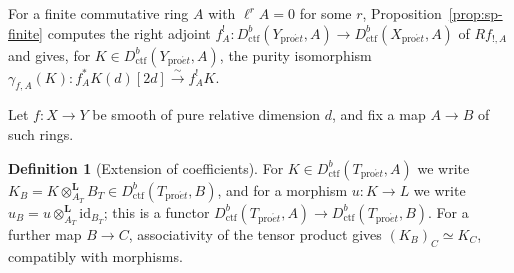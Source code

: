\documentclass[11pt,a4paper]{article}
\numberwithin{equation}{section}
\theoremstyle{definition}
\newtheorem{definition}[theorem]{Definition}
\theoremstyle{remark}
\newcommand{\proet}{\mathrm{pro}\acute{e}t}
\newcommand{\Dctf}{D^b_{\mathrm{ctf}}}
\begin{document}
For a finite commutative ring $A$ with $\ell^rA=0$ for some $r$,
Proposition~\ref{prop:sp-finite} computes the right
adjoint $f_A^!\colon\Dctf(Y_{\proet},A)\to\Dctf(X_{\proet},A)$ of
$Rf_{!,A}$ and gives, for $K\in\Dctf(Y_{\proet},A)$,
the purity isomorphism
$\gamma_{f,A}(K):f_A^*K(d)[2d]\xrightarrow{\sim}f_A^!K$.

Let $f:X\to Y$ be smooth of pure relative dimension $d$, and fix a map
$A\to B$ of such rings.

\begin{definition}[Extension of coefficients]
\label{def:sp-scalar-extension}
For $K\in\Dctf(T_{\proet},A)$ we write
$K_B=K\otimes^{\mathbf L}_{A_T}B_T\in\Dctf(T_{\proet},B)$, and for a
morphism $u:K\to L$ we write
$u_B=u\otimes^{\mathbf L}_{A_T}\mathrm{id}_{B_T}$; this is a functor
$\Dctf(T_{\proet},A)\to\Dctf(T_{\proet},B)$. For a further map
$B\to C$, associativity of the tensor product gives
$(K_B)_C\simeq K_C$, compatibly with morphisms.
\end{definition}
\end{document}
